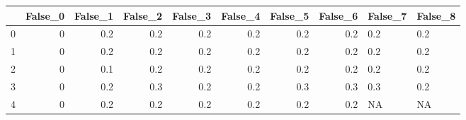 \begin{tabular}{lrrrrrrrll}
\toprule
{} &  False\_0 &  False\_1 &  False\_2 &  False\_3 &  False\_4 &  False\_5 &  False\_6 & False\_7 & False\_8 \\ \hline
\midrule
0 &        0 &      0.2 &      0.2 &      0.2 &      0.2 &      0.2 &      0.2 &     0.2 &     0.2 \\ \hline
1 &        0 &      0.2 &      0.2 &      0.2 &      0.2 &      0.2 &      0.2 &     0.2 &     0.2 \\ \hline
2 &        0 &      0.1 &      0.2 &      0.2 &      0.2 &      0.2 &      0.2 &     0.2 &     0.2 \\ \hline
3 &        0 &      0.2 &      0.3 &      0.2 &      0.2 &      0.3 &      0.3 &     0.3 &     0.2 \\ \hline
4 &        0 &      0.2 &      0.2 &      0.2 &      0.2 &      0.2 &      0.2 &      NA &      NA \\ \hline
\bottomrule
\end{tabular}
